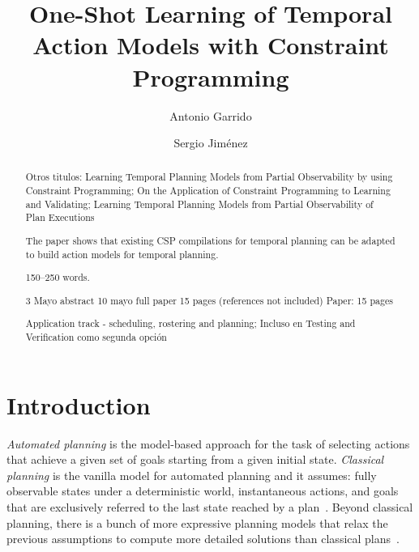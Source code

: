 \documentclass[runningheads]{llncs}
\begin{document}
\title{One-Shot Learning of Temporal Action Models with Constraint Programming}


%
\author{Antonio Garrido \and Sergio Jim\'enez}

%

\maketitle              %

\begin{abstract}
Otros titulos:  Learning Temporal Planning Models from Partial Observability by using Constraint Programming; On the Application of Constraint Programming to Learning and Validating;
Learning Temporal Planning Models from Partial Observability of Plan Executions

The paper shows that existing CSP compilations for temporal planning can be adapted to build action models for temporal planning.


150--250 words.

3 Mayo abstract
10 mayo full paper 15 pages (references not included)
Paper: 15 pages

Application track - scheduling, rostering and planning;
Incluso en Testing and Verification como segunda opción

\end{abstract}


\section{Introduction}
\label{sec:introduction}

{\em Automated planning} is the model-based approach for the task of selecting actions that achieve a given set of goals starting from a given initial state. {\em Classical planning} is the vanilla model for automated planning and it assumes: fully observable states under a deterministic world, instantaneous actions, and goals that are exclusively referred to the last state reached by a plan~\cite{geffner2013concise,ghallab2004automated}. Beyond classical planning, there is a bunch of more expressive planning models that relax the previous assumptions to compute more detailed solutions than classical plans~\cite{ghallab2004automated}.
\end{document}
